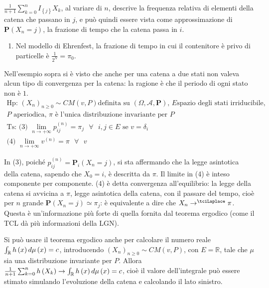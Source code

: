 \documentclass{article}
\begin{document}
$\frac{1}{n+1}\sum_{k=0}^{n}I_{\left\{ j\right\} }X_{k}$, al variare di $n$,
descrive la frequenza relativa di elementi della catena che passano in $j$,
e pu\`{o} quindi essere vista come approssimazione di $\mathbf{P}\left(
X_{n}=j\right) $, la frazione di tempo che la catena passa in $i$.

\begin{enumerate}
\item Nel modello di Ehrenfest, la frazione di tempo in cui il contenitore 
\`{e} privo di particelle \`{e} $\frac{1}{2^{N}}=\pi _{0}$.
\end{enumerate}

Nell'esempio sopra si \`{e} visto che anche per una catena a due stati non
valeva alcun tipo di convergenza per la catena: la ragione \`{e} che il
periodo di ogni stato non \`{e} $1$.%
\begin{gather*}
\text{Hp: }\left( X_{n}\right) _{n\geq 0}\sim CM\left( v,P\right) \text{
definita su }\left( \Omega ,\mathcal{A},\mathbf{P}\right) \text{, }E\text{
spazio degli stati irriducibile,} \\
P\text{ aperiodica, }\pi \text{ \`{e} l'unica distribuzione invariante per }P
\\
\text{Ts: (3) }\lim_{n\rightarrow +\infty }p_{ij}^{\left( n\right) }=\pi _{j}%
\text{ }\forall \text{ }i,j\in E\text{ se }v=\delta _{i} \\
\text{(4) }\lim_{n\rightarrow +\infty }v^{\left( n\right) }=\pi \text{ }%
\forall \text{ }v
\end{gather*}

In (3), poich\'{e} $%
p_{ij}^{\left( n\right) }=\mathbf{P}_{i}\left( X_{n}=j\right) $, si sta
affermando che la legge asintotica della catena, sapendo che $X_{0}=i$, \`{e}
descritta da $\pi $. Il limite in (4) \`{e} inteso componente per
componente. (4) \`{e} detta convergenza all'equilibrio: la legge della
catena si avvicina a $\pi $, legge asintotica della catena, con il passare
del tempo, cio\`{e} per $n$ grande $\mathbf{P}\left( X_{n}=j\right) \simeq
\pi _{j}$: \`{e} equivalente a dire che $X_{n}\rightarrow ^{\tciLaplace }\pi 
$. Questa \`{e} un'informazione pi\`{u} forte di quella fornita dal teorema
ergodico (come il TCL d\`{a} pi\`{u} informazioni della LGN).

Si pu\`{o} usare il teorema ergodico anche per calcolare il numero reale $%
\int_{%
\mathbb{R}
}h\left( x\right) d\mu \left( x\right) =c$, introducendo $\left(
X_{n}\right) _{n\geq 0}\sim CM\left( v,P\right) $, con $E=%
\mathbb{R}
$, tale che $\mu $ sia una distribuzione invariante per $P$. Allora $\frac{1%
}{n+1}\sum_{k=0}^{n}h\left( X_{k}\right) \rightarrow \int_{%
\mathbb{R}
}h\left( x\right) d\mu \left( x\right) =c$, cio\`{e} il valore
dell'integrale pu\`{o} essere stimato simulando l'evoluzione della catena e
calcolando il lato sinistro.
\end{document}
